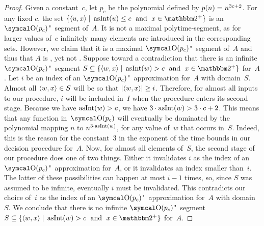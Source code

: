 \begin{proof}
  Given a constant~$c$, let $p_c$ be the polynomial defined by $p(n) = n^{3c + 2}$.
  For any fixed $c$, the set $\{\pair{u}{x} \st \asNat(u) \le c \reland x \in \binary^+\}$ is an $\bigO(p_c)$"~segment of~$A$.
  It is not a maximal polytime-segment, as for larger values of~$c$ infinitely many elements are introduced in the corresponding sets.
  However, we claim that it is a maximal $\bigO(p_c)$"~segment of~$A$ and thus that $A$ is , yet not .
  Suppose toward a contradiction that there is an infinite $\bigO(p_c)$"~segment $S \subseteq \{\pair{w}{x} \st \asNat(w) > c \reland x \in \binary^+\}$ for~$A$.
  Let $i$ be an index of an $\bigO(p_c)$"~approximation for~$A$ with domain~$S$.
  Almost all ${\langle w, x\rangle} \in S$ will be so that ${\lvert{\langle w, x\rangle}\rvert} \ge i$.
  Therefore, for almost all inputs to our procedure, $i$ will be included in~$I$ when the procedure enters its second stage.
  Because we have $\operatorname{asInt}(w) > c$, we have $3 \cdot \operatorname{asInt}(w) > 3 \cdot c + 2$.
  This means that any function in~$\bigO(p_c)$ will eventually be dominated by the polynomial mapping $n$ to $n^{3 \cdot \operatorname{asInt}(w)}$, for any value of~$w$ that occurs in~$S$.
  Indeed, this is the reason for the constant~$3$ in the exponent of the time bounds in our decision procedure for~$A$.
  Now, for almost all elements of~$S$, the second stage of our procedure does one of two things.
  Either it invalidates $i$ as the index of an $\bigO(p_c)$"~approximation for~$A$, or it invalidates an index smaller than~$i$.
  The latter of these possibilities can happen at most $i - 1$ times, so, since $S$ was assumed to be infinite, eventually $i$ must be invalidated.
  This contradicts our choice of~$i$ as the index of an $\bigO(p_c)$"~approximation for~$A$ with domain~$S$.
  We conclude that there is no infinite $\bigO(p_c)$"~segment $S \subseteq \{\pair{w}{x} \st \asNat(w) > c \reland x \in \binary^+\}$ for~$A$.
\end{proof}
%

